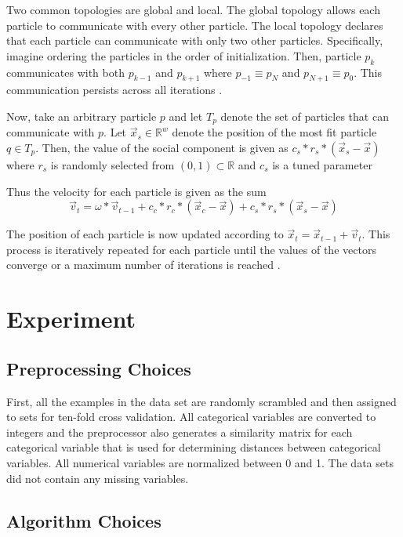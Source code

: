 \documentclass[twoside,11pt]{article}
\newcommand{\Rw}{\mathbb{R}^w }
\begin{document}
	Two common topologies are global and local. 
	The global topology allows each particle to communicate with every other particle. 
	The local topology declares that each particle can communicate with only two other particles.
	Specifically, imagine ordering the particles in the order of initialization.
	Then, particle $p_k$ communicates with both $p_{k-1}$ and $p_{k+1}$ where $p_{-1} \equiv p_N$ and $p_{N+1} \equiv p_{0}$.
	This communication persists across all iterations \citep{og-pso}.
	
	Now, take an arbitrary particle $p$ and let $T_p$ denote the set of particles that can communicate with $p$.
	Let $\vec{x}_s \in \Rw$ denote the position of the most fit particle $q \in T_p$. Then, the value of the social component is given as $c_s * r_s * (\vec{x}_s - \vec{x})$ where $r_s$ is randomly selected from $(0,1) \subset \mathbb{R}$ and $c_s$ is a tuned parameter
	
	Thus the velocity for each particle is given as the sum
	$$\vec{v}_t = \omega * \vec{v}_{t-1} + c_c*r_c*(\vec{x}_c - \vec{x}) + c_s*r_s*(\vec{x}_s - \vec{x})$$
	
	The position of each particle is now updated according to $\vec{x}_t = \vec{x}_{t-1} + \vec{v}_t$. This process is iteratively repeated for each particle until the values of the vectors converge or a maximum number of iterations is reached \citep{og-pso}.
		
\section{Experiment}

\subsection{Preprocessing Choices}

	First, all the examples in the data set are randomly scrambled and then assigned to sets for ten-fold cross validation. 
	All categorical variables are converted to integers 
	and the preprocessor also generates a similarity matrix for each categorical variable that is used for determining distances between categorical variables. 
	All numerical variables are normalized between 0 and 1. 
	The data sets did not contain any missing variables.

\subsection{Algorithm Choices}
\end{document}
